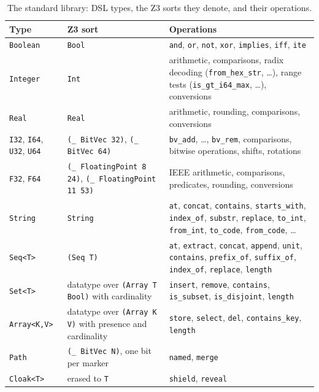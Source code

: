 \documentclass[sigconf,screen]{acmart}
\theoremstyle{definition}
\theoremstyle{remark}
\newcommand{\code}[1]{\texttt{#1}}
\begin{document}
\begin{table}[t]
\caption{The standard library: DSL types, the Z3 sorts they denote, and their
operations.}
\label{tab:stdlib}
\scriptsize
\setlength{\tabcolsep}{3pt}
\begin{tabular}{@{}p{}p{}p{}@{}}
\toprule
Type & Z3 sort & Operations \\
\midrule
\code{Boolean} & \code{Bool} & \code{and}, \code{or}, \code{not}, \code{xor}, \code{implies}, \code{iff}, \code{ite} \\
\code{Integer} & \code{Int} & arithmetic, comparisons, radix decoding (\code{from\_hex\_str}, \ldots), range tests (\code{is\_gt\_i64\_max}, \ldots), conversions \\
\code{Real} & \code{Real} & arithmetic, rounding, comparisons, conversions \\
\code{I32}, \code{I64}, \code{U32}, \code{U64} & \code{(\_ BitVec 32)}, \code{(\_ BitVec 64)} & \code{bv\_add}, \ldots, \code{bv\_rem}, comparisons, bitwise operations, shifts, rotations \\
\code{F32}, \code{F64} & \code{(\_ FloatingPoint 8 24)}, \code{(\_ FloatingPoint 11 53)} & IEEE arithmetic, comparisons, predicates, rounding, conversions \\
\code{String} & \code{String} & \code{at}, \code{concat}, \code{contains}, \code{starts\_with}, \code{index\_of}, \code{substr}, \code{replace}, \code{to\_int}, \code{from\_int}, \code{to\_code}, \code{from\_code}, \ldots \\
\code{Seq<T>} & \code{(Seq T)} & \code{at}, \code{extract}, \code{concat}, \code{append}, \code{unit}, \code{contains}, \code{prefix\_of}, \code{suffix\_of}, \code{index\_of}, \code{replace}, \code{length} \\
\code{Set<T>} & datatype over \code{(Array T Bool)} with cardinality & \code{insert}, \code{remove}, \code{contains}, \code{is\_subset}, \code{is\_disjoint}, \code{length} \\
\code{Array<K,V>} & datatype over \code{(Array K V)} with presence and cardinality & \code{store}, \code{select}, \code{del}, \code{contains\_key}, \code{length} \\
\code{Path} & \code{(\_ BitVec N)}, one bit per marker & \code{named}, \code{merge} \\
\code{Cloak<T>} & erased to \code{T} & \code{shield}, \code{reveal} \\
\bottomrule
\end{tabular}
\end{table}
\end{document}
